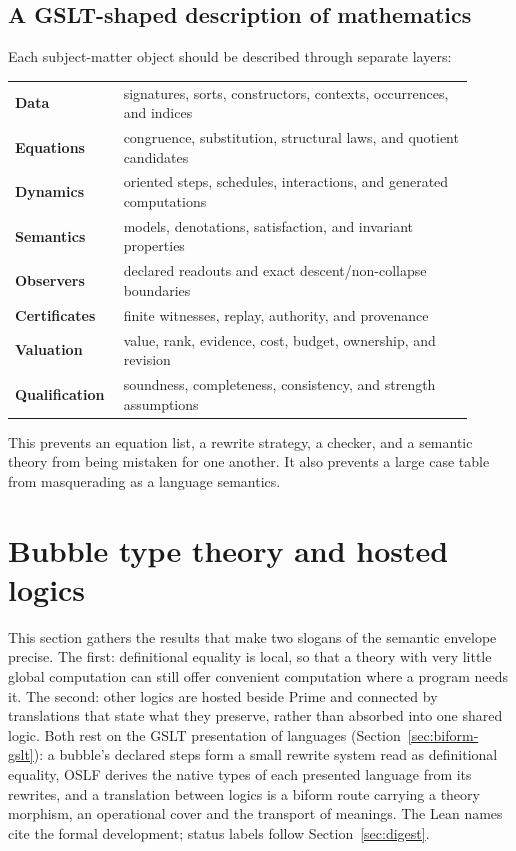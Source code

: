\documentclass[11pt]{article}
\theoremstyle{definition}
\theoremstyle{remark}
\begin{document}
\subsection{A GSLT-shaped description of mathematics}

Each subject-matter object should be described through separate layers:

\begin{center}
\begin{tabular}{>{\bfseries}p{0.19\linewidth}p{0.72\linewidth}}
\toprule
Data & signatures, sorts, constructors, contexts, occurrences, and indices \\
Equations & congruence, substitution, structural laws, and quotient candidates \\
Dynamics & oriented steps, schedules, interactions, and generated computations \\
Semantics & models, denotations, satisfaction, and invariant properties \\
Observers & declared readouts and exact descent/non-collapse boundaries \\
Certificates & finite witnesses, replay, authority, and provenance \\
Valuation & value, rank, evidence, cost, budget, ownership, and revision \\
Qualification & soundness, completeness, consistency, and strength assumptions \\
\bottomrule
\end{tabular}
\end{center}

This prevents an equation list, a rewrite strategy, a checker, and a semantic
theory from being mistaken for one another.  It also prevents a large case table
from masquerading as a language semantics.

\section{Bubble type theory and hosted logics}
\label{sec:bubbles-hosted}

This section gathers the results that make two slogans of the semantic
envelope precise. The first: definitional equality is local, so that a theory
with very little global computation can still offer convenient computation
where a program needs it. The second: other logics are hosted beside Prime and
connected by translations that state what they preserve, rather than absorbed
into one shared logic. Both rest on the GSLT presentation of languages
(Section~\ref{sec:biform-gslt}): a bubble's declared steps form a small rewrite
system read as definitional equality, OSLF derives the native types of each
presented language from its rewrites, and a translation between logics is a
biform route carrying a theory morphism, an operational cover and the transport
of meanings. The Lean names cite the formal development; status
labels follow Section~\ref{sec:digest}.
\end{document}
